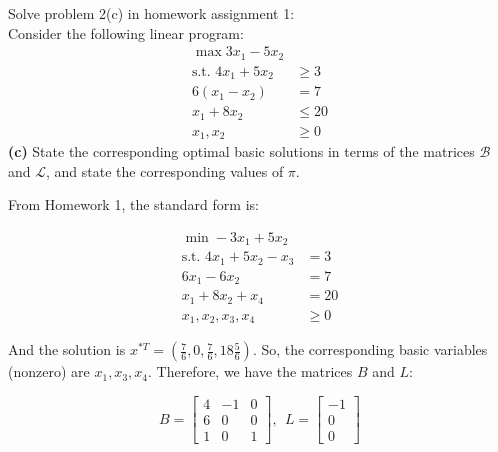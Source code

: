 \documentclass[fleqn]{homework}
\begin{document}
  \maketitle

  \begin{problem}{1}
    \begin{question}
      Solve problem 2(c) in homework assignment 1:\\
      Consider the following linear program:
      \begin{align*}
        \max 3x_1 - 5x_2 & \\
        \text{s.t.  } 4x_1 + 5x_2 &\ge 3 \\
        6(x_1 - x_2) &= 7 \\
        x_1 + 8x_2 &\le 20 \\
        x_1, x_2 &\ge 0
      \end{align*}
      \textbf{(c)} State the corresponding optimal basic solutions in terms of
      the matrices $\mathcal{B}$ and $\mathcal{L}$, and state the corresponding
      values of $\pi$.
    \end{question}

    From Homework 1, the standard form is:

    \begin{align*}
      \min -3x_1 + 5x_2 & \\
      \text{s.t. } 4x_1 + 5x_2 - x_3 &= 3 \\
      6x_1 - 6x_2 &= 7 \\
      x_1 + 8x_2 + x_4 &= 20 \\
      x_1, x_2, x_3, x_4 &\geq 0
    \end{align*}

    And the solution is
    $x^{*T} = (\frac{7}{6}, 0, \frac{7}{6}, 18 \frac{5}{6})$.  So, the
    corresponding basic variables (nonzero) are $x_1, x_3, x_4$.  Therefore, we
    have the matrices $B$ and $L$:

    \begin{equation}
      B = \begin{bmatrix*} 4 & -1 & 0 \\ 6 & 0 & 0 \\ 1 & 0 & 1 \end{bmatrix*},\:\:
      L = \begin{bmatrix*} -1 \\ 0 \\ 0 \end{bmatrix*}
    \end{equation}


\end{problem}
\end{document}
